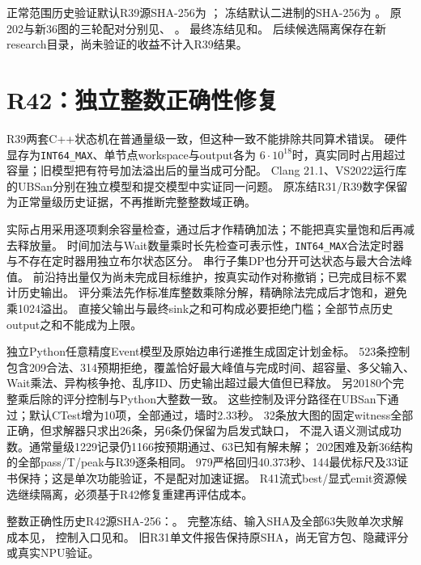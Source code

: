 \documentclass[UTF8,fontset=fandol,11pt]{ctexart}
\begin{document}
正常范围历史验证默认R39源SHA-256为
；
冻结默认二进制的SHA-256为
。
原202与新36图的三轮配对分别见、
。
最终冻结见和。
后续候选隔离保存在新research目录，尚未验证的收益不计入R39结果。


\section{R42：独立整数正确性修复}
R39两套C++状态机在普通量级一致，但这种一致不能排除共同算术错误。
硬件显存为\texttt{INT64\_MAX}、单节点workspace与output各为
$6\cdot10^{18}$时，真实同时占用超过容量；旧模型把有符号加法溢出后的量当成可分配。
Clang 21.1、VS2022运行库的UBSan分别在独立模型和提交模型中实证同一问题。
原冻结R31/R39数字保留为正常量级历史证据，不再推断完整整数域正确。

实际占用采用逐项剩余容量检查，通过后才作精确加法；不能把真实量饱和后再减去释放量。
时间加法与Wait数量乘时长先检查可表示性，\texttt{INT64\_MAX}合法定时器与不存在定时器用独立布尔状态区分。
串行子集DP也分开可达状态与最大合法峰值。
前沿持出量仅为尚未完成目标维护，按真实动作对称撤销；已完成目标不累计历史输出。
评分乘法先作标准库整数乘除分解，精确除法完成后才饱和，避免乘1024溢出。
直接父输出与最终sink之和可构成必要拒绝门槛；全部节点历史output之和不能成为上限。

独立Python任意精度Event模型及原始边串行递推生成固定计划金标。
523条控制包含209合法、314预期拒绝，覆盖恰好最大峰值与完成时间、超容量、多父输入、
Wait乘法、异构核争抢、乱序ID、历史输出超过最大值但已释放。
另20180个完整乘后除的评分控制与Python大整数一致。
这些控制及评分路径在UBSan下通过；默认CTest增为10项，全部通过，墙时2.33秒。
32条放大图的固定witness全部正确，但求解器只求出26条，另6条仍保留为启发式缺口，
不混入语义测试成功数。通常量级1229记录仍1166按预期通过、63已知有解未解；
202困难及新36结构的全部pass/T/peak与R39逐条相同。
979严格回归40.373秒、144最优标尺及33证书保持；这是单次功能验证，不是配对加速证据。
R41流式best/显式emit资源候选继续隔离，必须基于R42修复重建再评估成本。

整数正确性历史R42源SHA-256：。
完整冻结、输入SHA及全部63失败单次求解成本见，
控制入口见和。
旧R31单文件报告保持原SHA，尚无官方包、隐藏评分或真实NPU验证。
\end{document}
